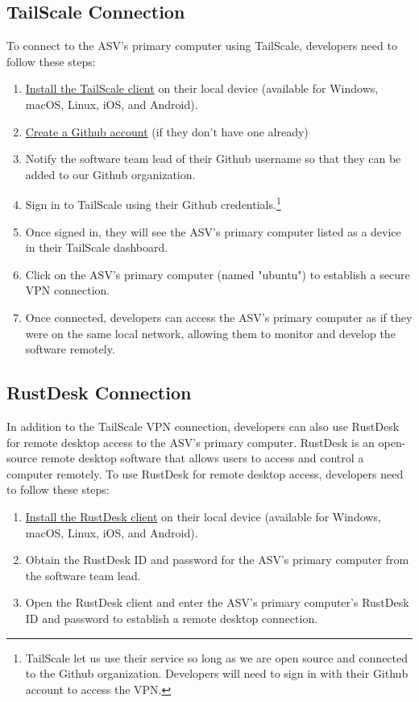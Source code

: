 \subsection{TailScale Connection}
To connect to the ASV's primary computer using TailScale, developers need to follow these steps:

\begin{enumerate}
    \item \href{https://tailscale.com/download/}{Install the TailScale client} on their local device (available for Windows, macOS, Linux, iOS, and Android).
    \item \href{https://github.com/signup}{Create a Github account} (if they don't have one already)
    \item Notify the software team lead of their Github username so that they can be added to our Github organization.
    \item Sign in to TailScale using their Github credentials.\footnote{TailScale let us use their service so long as we are open source and connected to the Github organization. Developers will need to sign in with their Github account to access the VPN.}
    \item Once signed in, they will see the ASV's primary computer listed as a device in their TailScale dashboard.
    \item Click on the ASV's primary computer (named "ubuntu") to establish a secure VPN connection.
    \item Once connected, developers can access the ASV's primary computer as if they were on the same local network, allowing them to monitor and develop the software remotely.
\end{enumerate}

\subsection{RustDesk Connection}

In addition to the TailScale VPN connection, developers can also use RustDesk for remote desktop access to the ASV's primary computer.
RustDesk is an open-source remote desktop software that allows users to access and control a computer remotely.
To use RustDesk for remote desktop access, developers need to follow these steps:

\begin{enumerate}
    \item \href{https://rustdesk.com/}{Install the RustDesk client} on their local device (available for Windows, macOS, Linux, iOS, and Android).
    \item Obtain the RustDesk ID and password for the ASV's primary computer from the software team lead.
    \item Open the RustDesk client and enter the ASV's primary computer's RustDesk ID and password to establish a remote desktop connection.
\end{enumerate}
